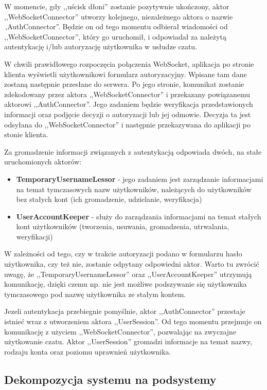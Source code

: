 \documentclass[11pt,oneside,a4paper,titlepage,onecolumn]{article}
\begin{document}
W momencie, gdy ,,uścisk dłoni'' zostanie pozytywnie ukończony, aktor ,,WebSocketConnector'' utworzy kolejnego, niezależnego aktora o nazwie
\,,AuthConnector''. Będzie on od tego momentu odbierał wiadomości od ,,WebSocketConnector'', który go uruchomił, i odpowiadał za należytą
autentykację i/lub autoryzację użytkownika w usłudze czatu.

W chwili prawidłowego rozpoczęcia połączenia WebSocket, aplikacja po stronie klienta wyświetli użytkownikowi formularz autoryzacyjny. Wpisane
tam dane zostaną następnie przesłane do serwera. Po jego stronie, komunikat zostanie zdekodowany przez aktora ,,WebSocketConnector'' i
przekazany powiązanemu aktorowi ,,AuthConnector''. Jego zadaniem będzie weryfikacja przedstawionych informacji oraz podjęcie decyzji o autoryzacji
lub jej odmowie. Decyzja ta jest odsyłana do ,,WebSocketConnector'' i następnie przekazywana do aplikacji po stonie klienta.

Za gromadzenie informacji związanych z autentykacją odpowiada dwóch, na stałe uruchomionych aktorów:
\begin{itemize}
	\item \textbf{TemporaryUsernameLessor} - jego zadaniem jest zarządzanie informacjami na temat tymczasowych nazw użytkowników, należących do
	użytkowników bez stałych kont (ich gromadzenie, udzielanie, weryfikacja)
	\item \textbf{UserAccountKeeper} - służy do zarządzania informacjami na temat stałych kont użytkowników (tworzenia, usuwania, gromadzenia,
	utrwalania, weryfikacji)
\end{itemize}
W zależności od tego, czy w trakcie autoryzacji podano w formularzu hasło użytkownika, czy też nie, zostanie odpytany odpowiedni aktor. Warto tu
zwrócić uwagę, że ,,TemporaryUsernameLessor'' oraz ,,UserAccountKeeper'' utrzymują komunikację, dzięki czemu np. nie jest możliwe podszywanie się
użytkownika tymczasowego pod nazwę użytkownika ze stałym kontem.

Jezeli autentykacja przebiegnie pomyślnie, aktor ,,AuthConnector'' przestaje istnieć wraz z utworzeniem aktora ,,UserSession''. Od tego momentu
przejmuje on komunikację z użyciem ,,WebSocketConnector'', pozwalając na zwyczajne użytkowanie czatu. Aktor ,,UserSession'' gromadzi informacje
na temat nazwy, rodzaju konta oraz poziomu uprawnień użytkownika. 

\subsection{Dekompozycja systemu na podsystemy}
\label{architektura_kompilatora}
\end{document}
